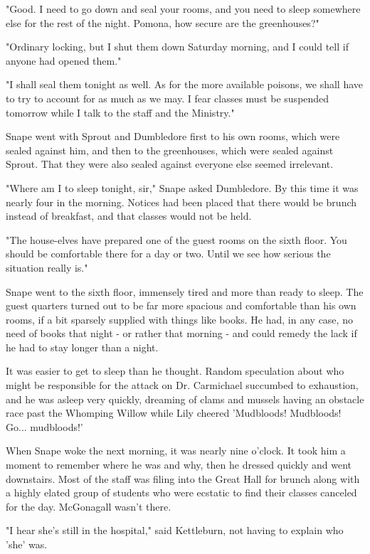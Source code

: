 \documentclass[a4paper,11pt]{article}
\begin{document}
"Good. I need to go down and seal your rooms, and you need to sleep somewhere else for the rest of the night. Pomona, how secure are the greenhouses?"

"Ordinary locking, but I shut them down Saturday morning, and I could tell if anyone had opened them."

"I shall seal them tonight as well. As for the more available poisons, we shall have to try to account for as much as we may. I fear classes must be suspended tomorrow while I talk to the staff and the Ministry."

Snape went with Sprout and Dumbledore first to his own rooms, which were sealed against him, and then to the greenhouses, which were sealed against Sprout. That they were also sealed against everyone else seemed irrelevant.

"Where am I to sleep tonight, sir," Snape asked Dumbledore. By this time it was nearly four in the morning. Notices had been placed that there would be brunch instead of breakfast, and that classes would not be held.

"The house-elves have prepared one of the guest rooms on the sixth floor. You should be comfortable there for a day or two. Until we see how serious the situation really is."

Snape went to the sixth floor, immensely tired and more than ready to sleep. The guest quarters turned out to be far more spacious and comfortable than his own rooms, if a bit sparsely supplied with things like books. He had, in any case, no need of books that night - or rather that morning - and could remedy the lack if he had to stay longer than a night.

It was easier to get to sleep than he thought. Random speculation about who might be responsible for the attack on Dr. Carmichael succumbed to exhaustion, and he was asleep very quickly, dreaming of clams and mussels having an obstacle race past the Whomping Willow while Lily cheered 'Mudbloods! Mudbloods! Go... mudbloods!'

When Snape woke the next morning, it was nearly nine o'clock. It took him a moment to remember where he was and why, then he dressed quickly and went downstairs. Most of the staff was filing into the Great Hall for brunch along with a highly elated group of students who were ecstatic to find their classes canceled for the day. McGonagall wasn't there.

"I hear she's still in the hospital," said Kettleburn, not having to explain who 'she' was.
\end{document}
